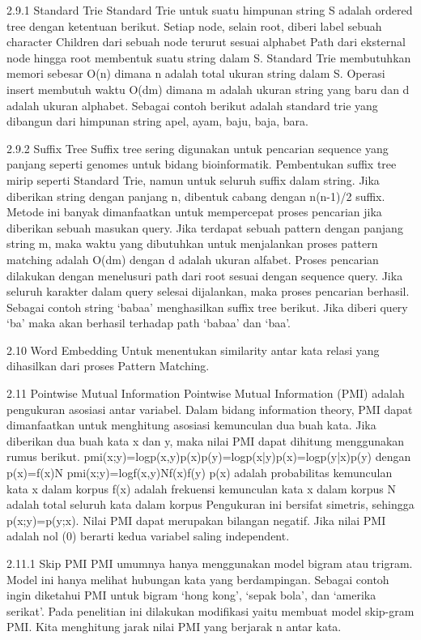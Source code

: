 2.9.1 Standard Trie
Standard Trie untuk suatu himpunan string S adalah ordered tree dengan ketentuan berikut.
Setiap node, selain root, diberi label sebuah character
Children dari sebuah node terurut sesuai alphabet
Path dari eksternal node hingga root membentuk suatu string dalam S.
Standard Trie membutuhkan memori sebesar O(n) dimana n adalah total ukuran string dalam S. Operasi insert membutuh waktu O(dm) dimana m adalah ukuran string yang baru dan d adalah ukuran alphabet.
Sebagai contoh berikut adalah standard trie yang dibangun dari himpunan string {apel, ayam, baju, baja, bara}.

2.9.2 Suffix Tree
Suffix tree sering digunakan untuk pencarian sequence yang panjang seperti genomes untuk bidang bioinformatik. Pembentukan suffix tree mirip seperti Standard Trie, namun untuk seluruh suffix dalam string. Jika diberikan string dengan panjang n, dibentuk cabang dengan n(n-1)/2 suffix.  Metode ini banyak dimanfaatkan untuk mempercepat proses pencarian jika diberikan sebuah masukan query. Jika terdapat sebuah pattern dengan panjang string m, maka waktu yang dibutuhkan untuk menjalankan proses pattern matching adalah O(dm) dengan d adalah ukuran alfabet. Proses pencarian dilakukan dengan menelusuri path dari root sesuai dengan sequence query. Jika seluruh karakter dalam query selesai dijalankan, maka proses pencarian berhasil. 
Sebagai contoh string ‘babaa’ menghasilkan suffix tree berikut. Jika diberi query ‘ba’ maka akan berhasil terhadap path ‘babaa’ dan ‘baa’.

2.10 Word Embedding
Untuk menentukan similarity antar kata relasi yang dihasilkan dari proses Pattern Matching.

2.11 Pointwise Mutual Information 
Pointwise Mutual Information (PMI) adalah pengukuran asosiasi antar variabel. Dalam bidang information theory, PMI dapat dimanfaatkan untuk menghitung asosiasi kemunculan dua buah kata. Jika diberikan dua buah kata x dan y, maka nilai PMI dapat dihitung menggunakan rumus berikut. 
pmi(x;y)=logp(x,y)p(x)p(y)=logp(x|y)p(x)=logp(y|x)p(y) dengan p(x)=f(x)N
pmi(x;y)=logf(x,y)Nf(x)f(y)
p(x) adalah probabilitas kemunculan kata x dalam korpus
f(x) adalah frekuensi kemunculan kata x dalam korpus
N adalah total seluruh kata dalam korpus
Pengukuran ini bersifat simetris, sehingga p(x;y)=p(y;x). Nilai PMI dapat merupakan bilangan negatif. Jika nilai PMI adalah nol (0) berarti kedua variabel saling independent.

2.11.1 Skip PMI 
PMI umumnya hanya menggunakan model bigram atau trigram. Model ini hanya melihat hubungan kata yang berdampingan. Sebagai contoh ingin diketahui PMI untuk bigram ‘hong kong’, ‘sepak bola’, dan ‘amerika serikat’. Pada penelitian ini dilakukan modifikasi yaitu membuat model skip-gram PMI. Kita menghitung jarak nilai PMI yang berjarak n antar kata. 


